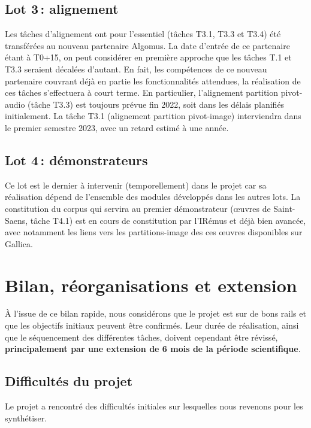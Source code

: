 \documentclass[11pt]{article}
\begin{document}
\subsection{Lot 3\,: alignement}

Les tâches d'alignement ont pour l'essentiel (tâches T3.1, T3.3 et T3.4) été transférées au nouveau partenaire Algomus. 
La date d'entrée de ce partenaire étant à T0+15, on peut considérer en première approche que
les tâches T.1 et T3.3 seraient décalées d'autant. En fait, les compétences de ce nouveau partenaire 
couvrant déjà en  partie les fonctionnalités attendues, la réalisation de ces tâches
s'effectuera à court terme. En particulier, l'alignement partition pivot-audio (tâche T3.3) est toujours
prévue fin 2022, soit dans les délais planifiés initialement. La tâche T3.1 
(alignement partition pivot-image) interviendra dans le premier semestre 2023, avec un 
retard estimé à une année.

\subsection{Lot 4\,: démonstrateurs}

Ce lot est le dernier à intervenir  (temporellement) dans le projet car sa réalisation 
dépend de l'ensemble des modules développés dans les autres lots. La constitution du corpus 
qui servira au premier démonstrateur (œuvres de Saint-Saens, tâche T4.1) est en cours de constitution
par l'IRémus et déjà bien avancée, avec notamment les liens vers les partitions-image
des ces œuvres disponibles sur Gallica. 

\section{Bilan, réorganisations et extension}\label{sec:bilan}

À l'issue de ce bilan rapide, nous considérons que le projet est sur de bons rails
et que les objectifs initiaux peuvent être confirmés. Leur 
durée de réalisation, ainsi que le séquencement des différentes tâches, doivent 
cependant être révissé, \textbf{principalement par une extension de 6 mois de
la période scientifique}. 

\subsection{Difficultés du projet}

Le projet a rencontré des difficultés initiales sur lesquelles nous revenons
pour les synthétiser.
 
\end{document}
